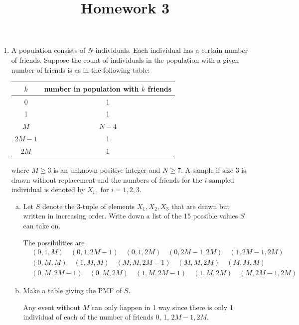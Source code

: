 \documentclass{article}
\begin{document}
\title{Homework 3}
\maketitle
\thispagestyle{fancy}

\begin{enumerate}
	\item A population consists of $N$ individuals. Each individual has a certain number of friends. Suppose the count of individuals in the population with a given number of friends is as in the following table:
		\begin{center}
			\begin{tabular}{c|c}
				$k$ & number in population with $k$ friends \\
				\hline 
				0 & 1 \\
				1 & 1 \\
				$M$ & $N-4$ \\
				$2M-1$ & 1 \\
				$2M$ & 1
			\end{tabular}
		\end{center}
		where $M\ge3$ is an unknown positive integer and $N\ge7.$ A sample if size 3 is drawn without replacement and the numbers of friends for the $i$ sampled individual is denoted by $X_i,$ for $i=1, 2, 3.$

		\begin{enumerate}[(a)]
			\item Let $S$ denote the 3-tuple of elements $X_1, X_2, X_3$ that are drawn but written in increasing order. Write down a list of the 15 possible values $S$ can take on.
				\begin{soln}
					The possibilities are 
					\begin{align*}
						&(0, 1, M)\quad(0, 1, 2M-1) \quad (0, 1, 2M) \quad (0, 2M-1, 2M)\quad (1, 2M-1, 2M) \\
						&(0, M, M)\quad(1, M, M)\quad(M, M, 2M-1)\quad(M, M, 2M)\quad (M, M, M) \\
						&(0, M, 2M-1)\quad(0, M, 2M)\quad(1, M, 2M-1)\quad(1, M, 2M)\quad(M, 2M-1, 2M)
					\end{align*}
				\end{soln}

			\item Make a table giving the PMF of $S.$
				\begin{soln}
					Any event without $M$ can only happen in 1 way since there is only 1 individual of each of the number of friends 0, 1, $2M-1, 2M.$ 


\end{soln}
\end{enumerate}
\end{enumerate}
\end{document}
